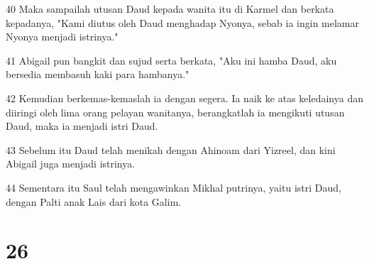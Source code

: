 \par 40 Maka sampailah utusan Daud kepada wanita itu di Karmel dan berkata kepadanya, "Kami diutus oleh Daud menghadap Nyonya, sebab ia ingin melamar Nyonya menjadi istrinya."
\par 41 Abigail pun bangkit dan sujud serta berkata, "Aku ini hamba Daud, aku bersedia membasuh kaki para hambanya."
\par 42 Kemudian berkemas-kemaslah ia dengan segera. Ia naik ke atas keledainya dan diiringi oleh lima orang pelayan wanitanya, berangkatlah ia mengikuti utusan Daud, maka ia menjadi istri Daud.
\par 43 Sebelum itu Daud telah menikah dengan Ahinoam dari Yizreel, dan kini Abigail juga menjadi istrinya.
\par 44 Sementara itu Saul telah mengawinkan Mikhal putrinya, yaitu istri Daud, dengan Palti anak Lais dari kota Galim.

\chapter{26}

